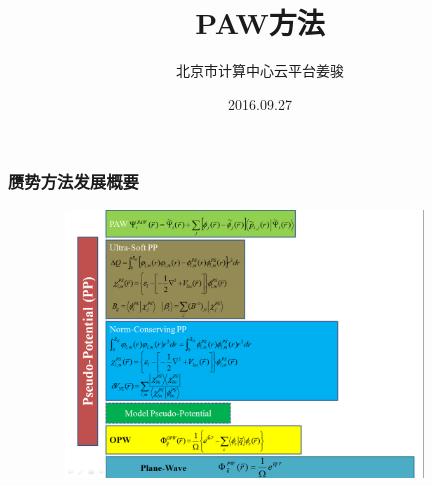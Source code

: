 \documentclass[cjk,slidestop,compress,mathserif,blue]{beamer}
\begin{document}

\title{PAW方法}

\author{北京市计算中心\;云平台\:姜骏}
\date{\textrm{2016.09.27}}
\frame{\titlepage}

\section*{}

\small
\frame
{
	\frametitle{赝势方法发展概要}
\begin{figure}[h!]
\centering
\vspace*{-0.25in}
\includegraphics[height=2.80in,width=4.10in,viewport=0 0 1190 875,clip]{Figures/Pseudo_Potential.png}
\label{Pseudo_Poential}
\end{figure}
}
\end{document}

